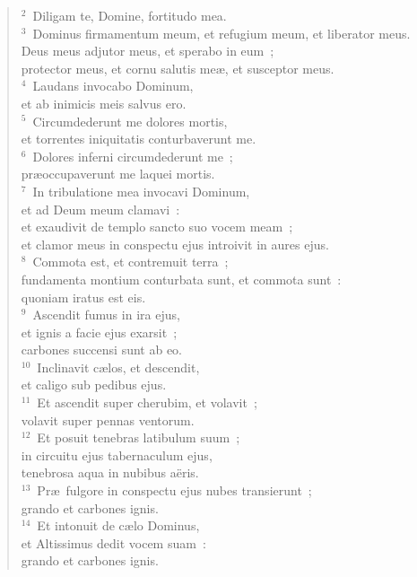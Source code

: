 \begin{flushleft}\begin{verse}\vspace{6pt}${}^{2}$~Diligam te, Domine, fortitudo mea.\\
${}^{3}$~Dominus firmamentum meum, et refugium meum, et liberator meus.\\ Deus meus adjutor meus, et sperabo in eum~;\\ protector meus, et cornu salutis me\ae , et susceptor meus.\\
${}^{4}$~Laudans invocabo Dominum,\\ et ab inimicis meis salvus ero.\\
${}^{5}$~Circumdederunt me dolores mortis,\\ et torrentes iniquitatis conturbaverunt me.\\
${}^{6}$~Dolores inferni circumdederunt me~;\\ pr\ae occupaverunt me laquei mortis.\\
${}^{7}$~In tribulatione mea invocavi Dominum,\\ et ad Deum meum clamavi~:\\ et exaudivit de templo sancto suo vocem meam~;\\ et clamor meus in conspectu ejus introivit in aures ejus.\\
${}^{8}$~Commota est, et contremuit terra~;\\ fundamenta montium conturbata sunt, et commota sunt~:\\ quoniam iratus est eis.\\
${}^{9}$~Ascendit fumus in ira ejus,\\ et ignis a facie ejus exarsit~;\\ carbones succensi sunt ab eo.\\
${}^{10}$~Inclinavit c\ae los, et descendit,\\ et caligo sub pedibus ejus.\\
${}^{11}$~Et ascendit super cherubim, et volavit~;\\ volavit super pennas ventorum.\\
${}^{12}$~Et posuit tenebras latibulum suum~;\\ in circuitu ejus tabernaculum ejus,\\ tenebrosa aqua in nubibus a\"eris.\\
${}^{13}$~Pr\ae\ fulgore in conspectu ejus nubes transierunt~;\\ grando et carbones ignis.\\
${}^{14}$~Et intonuit de c\ae lo Dominus,\\ et Altissimus dedit vocem suam~:\\ grando et carbones ignis.\\

\end{verse}
\end{flushleft}
